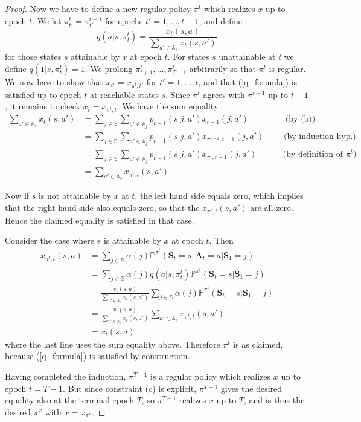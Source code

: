 \documentclass[10pt,a4paper]{amsart}
\begin{document}
\begin{proof}

Now we have to define a
new regular policy $\pi^t$ which realizes $x$ up to epoch $t$. We let $\pi^t_{t'} = \pi^{t-1}_{t'}$ 
for epochs $t'=1,\dots, t-1$, and define
$$
q(a|s,\pi^t_t) = \frac{x_t(s,a)}{\sum_{a'\in \mathbb{A}_s} x_t(s,a')}
$$
for those states $s$ attainable by $x$ at epoch $t$. For
states $s$ unattainable at $t$ we define
$q(1|s,\pi_t^t)=1$. We prolong $\pi_{t+1}^t,\dots,\pi_{T-1}^t$ arbitrarily so that $\pi^t$
is regular. We now have to show that $x_{t'} = x_{\pi^t,t'}$ for $t'=1,\dots, t$, and that (\ref{q_formula}) is satisfied up to epoch $t$
at reachable states $s$. Since $\pi^t$ agrees with $\pi^{t-1}$ up to $t-1$, it remains to
check $x_t = x_{\pi^t,t}$. 
%
We have the sum equality
\begin{align*}
    \sum_{a'\in \mathbb{A}_s} x_t(s,a') &= \sum_{j\in \mathbb{S}} \sum_{a'\in \mathbb{A}_j} p_{t-1} (s|j,a') x_{t-1}(j,a') 
    \qquad\qquad \mbox{ (by (b))}\\
    &= \sum_{j\in \mathbb{S}} \sum_{a'\in \mathbb{A}_j} p_{t-1} (s|j,a') x_{\pi^{t-1},t-1}(j,a')  \qquad \mbox{ (by induction hyp.)}\\
    &=\sum_{j\in \mathbb{S}} \sum_{a'\in \mathbb{A}_j} p_{t-1} (s|j,a') x_{\pi^t,t-1}(j,a') \qquad \;\,\,\,\mbox{ (by definition of $\pi^t$})\\
    &= \sum_{a'\in \mathbb{A}_s} x_{\pi^t,t}(s,a').
    \end{align*}

    Now if $s$ is not attainable by $x$ at $t$, the left hand side equals zero, which implies that the
    right hand side also equals zero, so that the
    $x_{\pi^t,t}(s,a')$ are all zero. Hence the claimed equality is satisfied in that case.
    

    Consider the case where $s$ is attainable by $x$ at epoch $t$. Then 
    \begin{align*}
    x_{\pi^t,t}(s,a) &= \sum_{j \in \mathbb{S}} \alpha(j) \mathbb P^{\pi^t}(\textbf{S}_t=s,\textbf{A}_t=a|\textbf{S}_1=j)\\
    &= \sum_{j\in \mathbb{S}} \alpha(j) q(a|s,\pi^t_t) \mathbb P^{\pi^t}(\textbf{S}_t=s|\textbf{S}_1=j)\\
    &= \frac{x_t(s,a)}{\sum_{a'\in \mathbb{A}_s} x_t(s,a')} \sum_{j\in \mathbb{S}} \alpha(j) \mathbb P^{\pi^t}(\textbf{S}_t=s|\textbf{S}_1=j)\\
    &=  \frac{x_t(s,a)}{\sum_{a'\in \mathbb{A}_s} x_t(s,a')} \sum_{a'\in \mathbb{A}_s} x_{\pi^t,t}(s,a')\\
    &= x_t(s,a)
    \end{align*}
    where the last line uses the sum equality above. Therefore $\pi^t$ is as claimed, because
    (\ref{q_formula}) is satisfied by construction. 

    Having completed the induction,
    $\pi^{T-1}$ is a regular policy which realizes $x$ up to epoch $t=T-1$.  But since constraint (c) is explicit, $\pi^{T-1}$
    gives the desired equality also at the terminal epoch $T$, so $\pi^{T-1}$ realizes $x$ up to $T$, and
    is thus the desired
    $\pi^x$ with $x = x_{\pi^x}$.
\end{proof}
\end{document}
